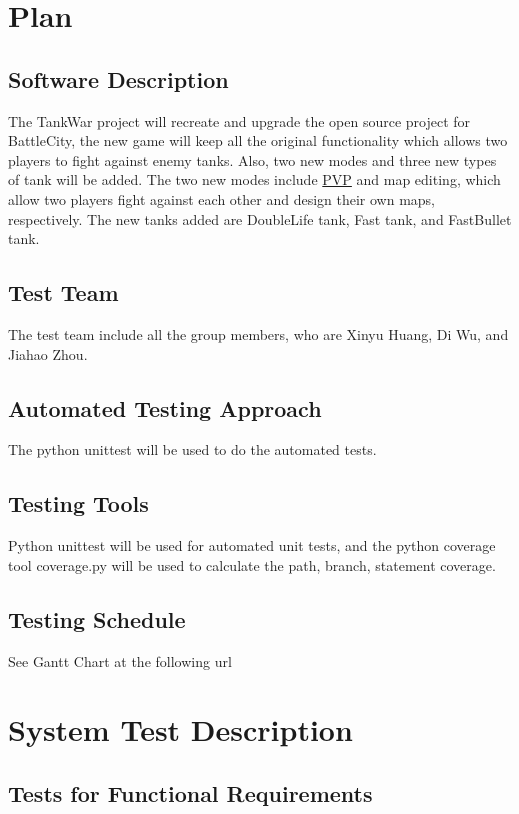 \documentclass[12pt, titlepage]{article}
\begin{document}
\section{Plan}
	
\subsection{Software Description}
The TankWar project will recreate and upgrade the open source project for BattleCity, the new game will keep all the original functionality which allows two players to fight against enemy tanks. Also, two new modes and three new types of tank will be added. The two new modes include \underline{PVP} and map editing, which allow two players fight against each other and design their own maps, respectively. The new tanks added are DoubleLife tank, Fast tank, and FastBullet tank.
\subsection{Test Team}
The test team include all the group members, who are Xinyu Huang, Di Wu, and Jiahao Zhou.
\subsection{Automated Testing Approach}
The python unittest will be used to do the automated tests.
\subsection{Testing Tools}
Python unittest will be used for automated unit tests, and the python coverage tool coverage.py will be used to calculate the path, branch, statement coverage.
\subsection{Testing Schedule}
		
See Gantt Chart at the following url

\section{System Test Description}

\subsection{Tests for Functional Requirements}
\end{document}
